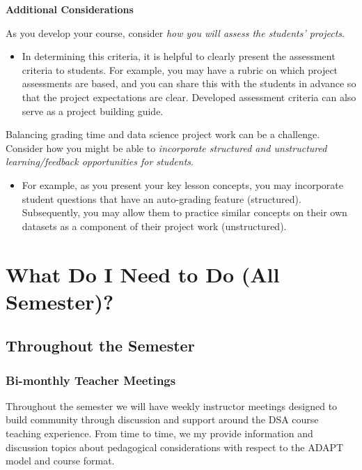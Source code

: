 \documentclass[
]{book}
\providecommand{\tightlist}{%
  \setlength{\itemsep}{0pt}\setlength{\parskip}{0pt}}
\begin{document}
\textbf{Additional Considerations}

As you develop your course, consider \emph{how you will assess the students' projects}.

\begin{itemize}
\tightlist
\item
  In determining this criteria, it is helpful to clearly present the assessment criteria to students. For example, you may have a rubric on which project assessments are based, and you can share this with the students in advance so that the project expectations are clear. Developed assessment criteria can also serve as a project building guide.
\end{itemize}

Balancing grading time and data science project work can be a challenge. Consider how you might be able to \emph{incorporate structured and unstructured learning/feedback opportunities for students}.

\begin{itemize}
\tightlist
\item
  For example, as you present your key lesson concepts, you may incorporate student questions that have an auto-grading feature (structured). Subsequently, you may allow them to practice similar concepts on their own datasets as a component of their project work (unstructured).
\end{itemize}

\hypertarget{what-do-i-need-to-do-all-semester}{%
\chapter{What Do I Need to Do (All Semester)?}\label{what-do-i-need-to-do-all-semester}}

\hypertarget{throughout-the-semester}{%
\section{Throughout the Semester}\label{throughout-the-semester}}

\hypertarget{bi-monthly-teacher-meetings}{%
\subsection{Bi-monthly Teacher Meetings}\label{bi-monthly-teacher-meetings}}

Throughout the semester we will have weekly instructor meetings designed to build community through discussion and support around the DSA course teaching experience. From time to time, we my provide information and discussion topics about pedagogical considerations with respect to the ADAPT model and course format.
\end{document}
